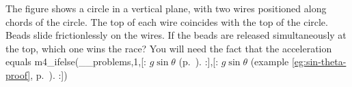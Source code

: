 The figure shows a circle in a vertical plane, with two wires positioned
along chords of the circle. The top of each wire coincides with the
top of the circle. Beads slide frictionlessly on the wires. If the beads
are released simultaneously at the top, which one wins the race?
You will need the fact that the acceleration equals
m4_ifelse(__problems,1,[:%
$g\sin\theta$ (p.~\pageref{inclined-plane}).
:],[:%
$g\sin\theta$ (example \ref{eg:sin-theta-proof}, p.~\pageref{eg:sin-theta-proof}).
:])%
